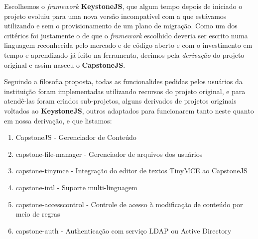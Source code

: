 Escolhemos o \textit{framework} \textbf{KeystoneJS}, que algum tempo depois de iniciado o projeto evoluiu para uma nova versão incompatível com a que estávamos utilizando e sem o provisionamento de um plano de migração. Como um dos critérios foi justamente o de que o \textit{framework} escolhido deveria ser escrito numa linguagem reconhecida pelo mercado e de código aberto e com o investimento em tempo e aprendizado já feito na ferramenta, decimos pela \textit{derivação} do projeto original e assim nasceu o \textbf{CapstoneJS}.

Seguindo a filosofia proposta, todas as funcionalides pedidas pelos usuários da instituição foram implementadas utilizando recursos do projeto original, e para atendê-las foram criados sub-projetos, alguns derivados de projetos originais voltados ao \textbf{KeystoneJS}, outros adaptados para funcionarem tanto neste quanto em nossa derivação, e que listamos:

\begin{enumerate}
    \item CapstoneJS - Gerenciador de Conteúdo
    \item capstone-file-manager - Gerenciador de arquivos dos usuários
    \item capstone-tinymce - Integração do editor de textos TinyMCE ao CapstoneJS
    \item capstone-intl - Suporte multi-linguagem
    \item capstone-accesscontrol - Controle de acesso à modificação de conteúdo por meio de regras
    \item capstone-auth - Authenticação com serviço LDAP ou Active Directory
\end{enumerate}

